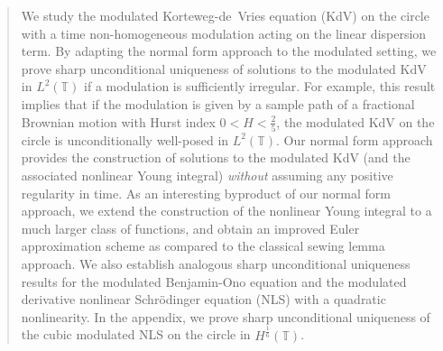 \documentclass[letterpaper, 11pt,  reqno]{amsart}
\newcommand{\1}{\hspace{0.5mm}\text{I}\hspace{0.5mm}}
\newcommand{\T}{\mathbb{T}}
\numberwithin{equation}{section}
\numberwithin{theorem}{section}
\begin{document}













\begin{abstract}

We study the modulated  Korteweg-de~Vries equation (KdV)
on the circle
with a time non-homogeneous modulation acting on the linear dispersion term.
By adapting the normal form approach to the modulated setting, 
we prove sharp unconditional uniqueness
of solutions to the modulated KdV in $L^2(\T)$
if a modulation is  sufficiently irregular.
For example, this result implies that if the modulation is given by 
a sample path of a fractional Brownian motion 
with Hurst index $0 < H < \frac 25$, the modulated KdV on the circle is 
unconditionally well-posed in $L^2(\T)$.
Our normal form approach provides the construction of solutions
to the modulated KdV
(and the associated nonlinear Young integral)
{\it without} assuming any positive regularity in time.
As an interesting byproduct of our normal form approach, 
we extend the construction of the 
nonlinear Young integral to a much larger class of functions, 
and obtain an improved Euler approximation scheme 
as compared to the classical sewing lemma approach.
We also establish analogous sharp unconditional uniqueness results
for the modulated Benjamin-Ono equation
and the modulated derivative nonlinear Schr\"odinger equation (NLS)
with a quadratic nonlinearity.
In the appendix, 
we 
prove sharp unconditional uniqueness 
of the cubic modulated NLS on the circle in $H^{\frac 16}(\T)$.






\end{abstract}
\end{document}
